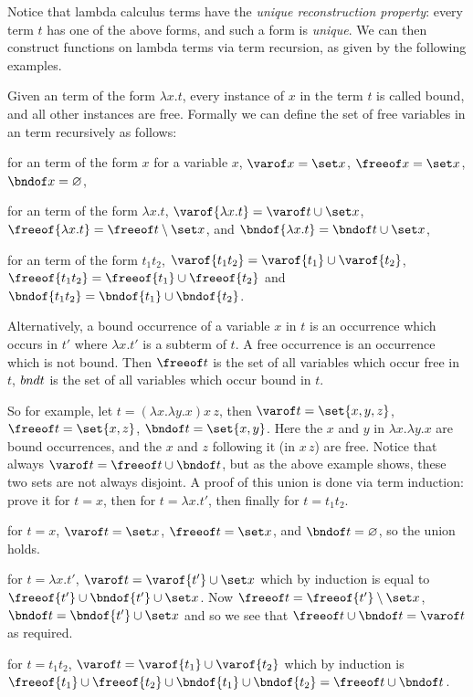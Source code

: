 \edefn

Notice that lambda calculus terms have the {\it unique reconstruction property}: every term $t$ has one of the above forms, and such a form is {\it unique}.
We can then construct functions on lambda terms via term recursion, as given by the following examples.

\bdefn

    Given an term of the form $\lambda x.t$, every instance of $x$ in the term $t$ is called {\emphcolor bound}, and all other instances are {\emphcolor free}.
    Formally we can define the set of free variables in an term recursively as follows:
    \benum
        \item for an term of the form $x$ for a variable $x$, $\varof x=\set x$, $\freeof x=\set x$, $\bndof x=\varnothing$,
        \item for an term of the form $\lambda x.t$, $\varof{\lambda x.t}=\varof t\cup\set x$, $\freeof{\lambda x.t}=\freeof t\setminus\set x$, and $\bndof{\lambda x.t}=\bndof t\cup\set x$,
        \item for an term of the form $t_1t_2$, $\varof{t_1t_2}=\varof{t_1}\cup\varof{t_2}$, $\freeof{t_1t_2}=\freeof{t_1}\cup\freeof{t_2}$ and $\bndof{t_1t_2}=\bndof{t_1}\cup\bndof{t_2}$.
    \eenum

    Alternatively, a {\emphcolor bound occurrence} of a variable $x$ in $t$ is an occurrence which occurs in $t'$ where $\lambda x.t'$ is a subterm of $t$.
    A {\emphcolor free occurrence} is an occurrence which is not bound.
    Then $\freeof t$ is the set of all variables which occur free in $t$, ${\sl bnd} t$ is the set of all variables which occur bound in $t$.

\edefn

So for example, let $t=(\lambda x.\lambda y.x)x\,z$, then $\varof t=\set{x,y,z}$, $\freeof t=\set{x,z}$, $\bndof t=\set{x,y}$.
Here the $x$ and $y$ in $\lambda x.\lambda y.x$ are bound occurrences, and the $x$ and $z$ following it (in $x\,z$) are free.
Notice that always $\varof t=\freeof t\cup\bndof t$, but as the above example shows, these two sets are not always disjoint.
A proof of this union is done via term induction: prove it for $t=x$, then for $t=\lambda x.t'$, then finally for $t=t_1t_2$.
\benum
    \item for $t=x$, $\varof t=\set x$, $\freeof t=\set x$, and $\bndof t=\varnothing$, so the union holds.
    \item for $t=\lambda x.t'$, $\varof t=\varof{t'}\cup\set x$ which by induction is equal to $\freeof{t'}\cup\bndof{t'}\cup\set x$.
        Now $\freeof t=\freeof{t'}\setminus\set x$, $\bndof t=\bndof{t'}\cup\set x$ and so we see that $\freeof t\cup\bndof t=\varof t$ as required.
    \item for $t=t_1t_2$, $\varof t=\varof{t_1}\cup\varof{t_2}$ which by induction is $\freeof{t_1}\cup\freeof{t_2}\cup\bndof{t_1}\cup\bndof{t_2}=\freeof t\cup\bndof t$.
\eenum

